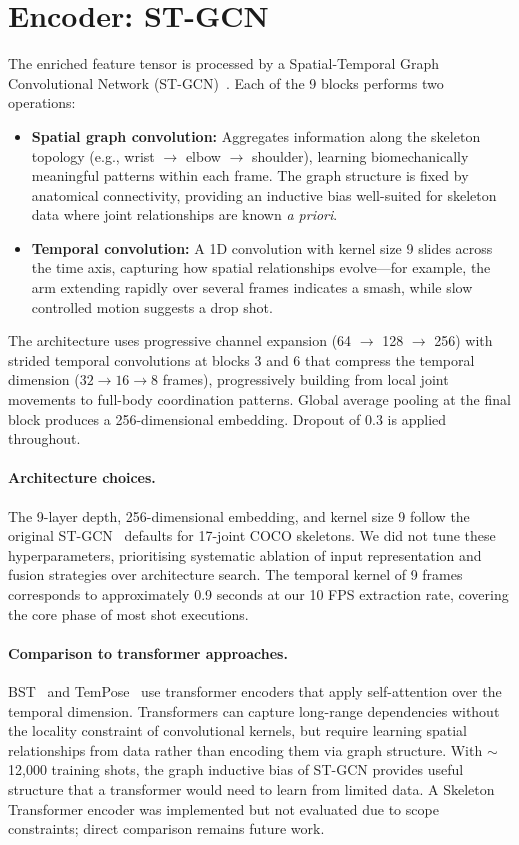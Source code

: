 \documentclass[11pt,a4paper]{article}
\begin{document}
\section{Encoder: ST-GCN}

The enriched feature tensor is processed by a Spatial-Temporal Graph Convolutional Network (ST-GCN)~\cite{stgcn}. Each of the 9 blocks performs two operations:
\begin{itemize}[leftmargin=*]
    \item \textbf{Spatial graph convolution:} Aggregates information along the skeleton topology (e.g., wrist $\to$ elbow $\to$ shoulder), learning biomechanically meaningful patterns within each frame. The graph structure is fixed by anatomical connectivity, providing an inductive bias well-suited for skeleton data where joint relationships are known \textit{a priori}.
    \item \textbf{Temporal convolution:} A 1D convolution with kernel size 9 slides across the time axis, capturing how spatial relationships evolve---for example, the arm extending rapidly over several frames indicates a smash, while slow controlled motion suggests a drop shot.
\end{itemize}

The architecture uses progressive channel expansion (64 $\to$ 128 $\to$ 256) with strided temporal convolutions at blocks 3 and 6 that compress the temporal dimension ($32 \to 16 \to 8$ frames), progressively building from local joint movements to full-body coordination patterns. Global average pooling at the final block produces a 256-dimensional embedding. Dropout of 0.3 is applied throughout.

\paragraph{Architecture choices.} The 9-layer depth, 256-dimensional embedding, and kernel size 9 follow the original ST-GCN~\cite{stgcn} defaults for 17-joint COCO skeletons. We did not tune these hyperparameters, prioritising systematic ablation of input representation and fusion strategies over architecture search. The temporal kernel of 9 frames corresponds to approximately 0.9 seconds at our 10 FPS extraction rate, covering the core phase of most shot executions.

\paragraph{Comparison to transformer approaches.} BST~\cite{bst} and TemPose~\cite{tempose} use transformer encoders that apply self-attention over the temporal dimension. Transformers can capture long-range dependencies without the locality constraint of convolutional kernels, but require learning spatial relationships from data rather than encoding them via graph structure. With $\sim$12,000 training shots, the graph inductive bias of ST-GCN provides useful structure that a transformer would need to learn from limited data. A Skeleton Transformer encoder was implemented but not evaluated due to scope constraints; direct comparison remains future work.
\end{document}
